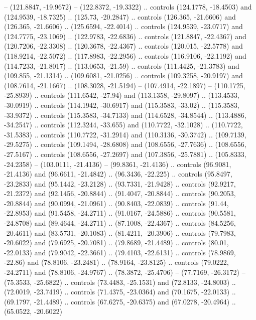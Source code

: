 {    -- (121.8847, -19.9672)
    -- (122.8372, -19.3322)
    .. controls (124.1778, -18.4503) and (124.9539, -18.7325) .. (125.73, -20.2847)
    .. controls (126.365, -21.6606) and (126.365, -21.6606) .. (125.6594, -22.4014)
    .. controls (124.9539, -23.0717) and (124.7775, -23.1069) .. (122.9783, -22.6836)
    .. controls (121.8847, -22.4367) and (120.7206, -22.3308) .. (120.3678, -22.4367)
    .. controls (120.015, -22.5778) and (118.9214, -22.5072) .. (117.8983, -22.2956)
    .. controls (116.9106, -22.1192) and (114.7233, -21.8017) .. (113.0653, -21.59)
    .. controls (111.4425, -21.3783) and (109.855, -21.1314) .. (109.6081, -21.0256)
    .. controls (109.3258, -20.9197) and (108.7614, -21.1667) .. (108.3028, -21.5194)
    -- (107.4914, -22.1897)
    -- (110.1725, -25.8939)
    .. controls (111.6542, -27.94) and (113.1358, -29.8097) .. (113.4533, -30.0919)
    .. controls (114.1942, -30.6917) and (115.3583, -33.02) .. (115.3583, -33.9372)
    .. controls (115.3583, -34.7133) and (114.6528, -34.8544) .. (113.4886, -34.2547)
    .. controls (112.3244, -33.655) and (110.7722, -32.1028) .. (110.7722, -31.5383)
    .. controls (110.7722, -31.2914) and (110.3136, -30.3742) .. (109.7139, -29.5275)
    .. controls (109.1494, -28.6808) and (108.6556, -27.7636) .. (108.6556, -27.5167)
    .. controls (108.6556, -27.2697) and (107.3856, -25.7881) .. (105.8333, -24.2358)
    -- (103.0111, -21.4136)
    -- (99.8361, -21.4136)
    .. controls (96.9081, -21.4136) and (96.6611, -21.4842) .. (96.3436, -22.225)
    .. controls (95.8497, -23.2833) and (95.1442, -23.2128) .. (93.7331, -21.9428)
    .. controls (92.9217, -21.2372) and (92.1456, -20.8844) .. (91.4047, -20.8844)
    .. controls (90.2053, -20.8844) and (90.0994, -21.0961) .. (90.8403, -22.0839)
    .. controls (91.44, -22.8953) and (91.5458, -24.2711) .. (91.0167, -24.5886)
    .. controls (90.5581, -24.8708) and (89.4644, -24.2711) .. (87.1008, -22.4367)
    .. controls (84.5256, -20.4611) and (83.5731, -20.1083) .. (81.4211, -20.3906)
    .. controls (79.7983, -20.6022) and (79.6925, -20.7081) .. (79.8689, -21.4489)
    .. controls (80.01, -22.0133) and (79.9042, -22.3661) .. (79.4103, -22.6131)
    .. controls (78.9869, -22.86) and (78.8106, -23.2481) .. (78.9164, -23.8125)
    .. controls (79.0222, -24.2711) and (78.8106, -24.9767) .. (78.3872, -25.4706)
    -- (77.7169, -26.3172)
    -- (75.3533, -25.6822)
    .. controls (73.4483, -25.1531) and (72.8133, -24.8003) .. (72.0019, -23.7419)
    .. controls (71.4375, -23.0364) and (70.1675, -22.0133) .. (69.1797, -21.4489)
    .. controls (67.6275, -20.6375) and (67.0278, -20.4964) .. (65.0522, -20.6022)
}

